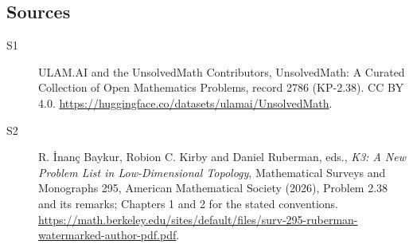 \documentclass[11pt]{article}
\begin{document}
\subsection{Sources}
\begin{description}
\item[\hypertarget{source:2786:1}{S1}] ULAM.AI and the UnsolvedMath Contributors, UnsolvedMath: A Curated Collection of Open Mathematics Problems, record 2786 (KP-2.38). CC BY 4.0. \url{https://huggingface.co/datasets/ulamai/UnsolvedMath}.
\item[\hypertarget{source:2786:2}{S2}] R. İnanç Baykur, Robion C. Kirby and Daniel Ruberman, eds., \emph{K3: A New Problem List in Low-Dimensional Topology}, Mathematical Surveys and Monographs 295, American Mathematical Society (2026), Problem 2.38 and its remarks; Chapters 1 and 2 for the stated conventions. \url{https://math.berkeley.edu/sites/default/files/surv-295-ruberman-watermarked-author-pdf.pdf}.
\end{description}
\label{end:2786}
\end{document}
